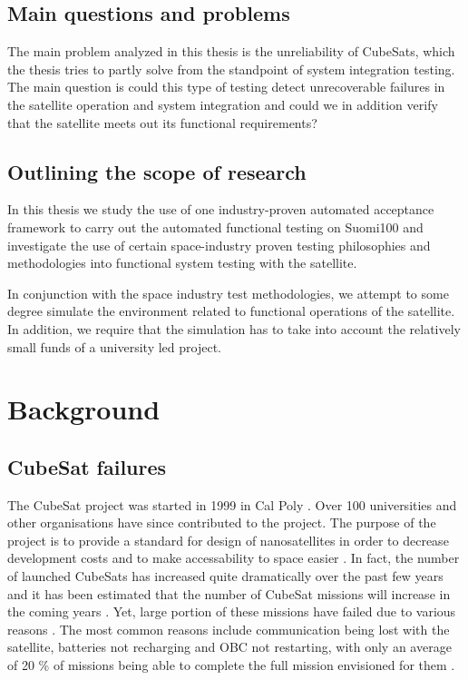 \documentclass[english,12pt,a4paper,pdftex,elec,utf8]{aaltothesis}
\begin{document}
\subsection{Main questions and problems}
The main problem analyzed in this thesis is the unreliability of CubeSats, which the thesis tries to partly solve from the standpoint of system integration testing. The main question is could this type of testing detect unrecoverable failures in the satellite operation and system integration and could we in addition verify that the satellite meets out its functional requirements?
\subsection{Outlining the scope of research}
In this thesis we study the use of one industry-proven automated acceptance framework to carry out the automated functional testing on Suomi100 and investigate the use of certain space-industry proven testing philosophies and methodologies into functional system testing with the satellite.\par
In conjunction with the space industry test methodologies, we attempt to some degree simulate the environment related to functional operations of the satellite. In addition, we require that the simulation has to take into account the relatively small funds of a university led project.\par




\clearpage

\section{Background}
\subsection{CubeSat failures}
The CubeSat project was started in 1999 in Cal Poly \cite{cds}. Over 100 universities and other organisations have since contributed to the project. The purpose of the project is to provide a standard for design of nanosatellites in order to decrease development costs and to make accessability to space easier \cite{cds}. In fact, the number of launched CubeSats has increased quite dramatically over the past few years \cite{Swart2016} and it has been estimated that the number of CubeSat missions will increase in the coming years \cite{SpaceWorks2017}. Yet, large portion of these missions have failed due to various reasons \cite{Swart2016, Swart1, Swart2015}. The most common reasons include communication being lost with the satellite, batteries not recharging and OBC not restarting, with only an average of 20 \% of missions being able to complete the full mission envisioned for them \cite{Swart2016}. \par 
\end{document}
